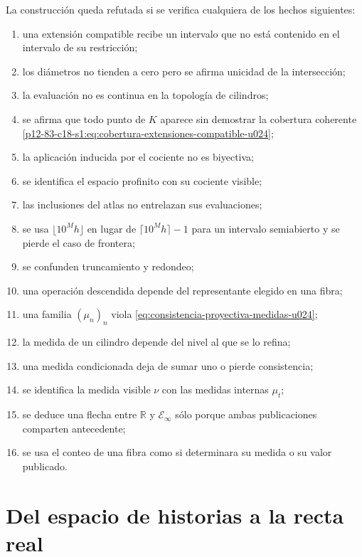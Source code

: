 \begin{criterion}
La construcción queda refutada si se verifica cualquiera de los hechos
siguientes:
\begin{enumerate}
 \item una extensión compatible recibe un intervalo que no está contenido
       en el intervalo de su restricción;
 \item los diámetros no tienden a cero pero se afirma unicidad de la
       intersección;
 \item la evaluación no es continua en la topología de cilindros;
 \item se afirma que todo punto de \(K\) aparece sin demostrar la cobertura
       coherente \eqref{p12-83-c18-s1:eq:cobertura-extensiones-compatible-u024};
 \item la aplicación inducida por el cociente no es biyectiva;
 \item se identifica el espacio profinito con su cociente visible;
 \item las inclusiones del atlas no entrelazan sus evaluaciones;
 \item se usa \(\lfloor10^Mh\rfloor\) en lugar de
       \(\lceil10^Mh\rceil-1\) para un intervalo semiabierto y se pierde
       el caso de frontera;
 \item se confunden truncamiento y redondeo;
 \item una operación descendida depende del representante elegido en una
       fibra;
 \item una familia \((\mu_n)_n\) viola
       \eqref{eq:consistencia-proyectiva-medidas-u024};
 \item la medida de un cilindro depende del nivel al que se lo refina;
 \item una medida condicionada deja de sumar uno o pierde consistencia;
 \item se identifica la medida visible \(\nu\) con las medidas internas
       \(\mu_t\);
 \item se deduce una flecha entre \(\mathbb R\) y
       \(\mathcal E_\infty\) sólo porque ambas publicaciones comparten
       antecedente;
 \item se usa el conteo de una fibra como si determinara su medida o su
       valor publicado.
\end{enumerate}
\end{criterion}


\section{Del espacio de historias a la recta real}

